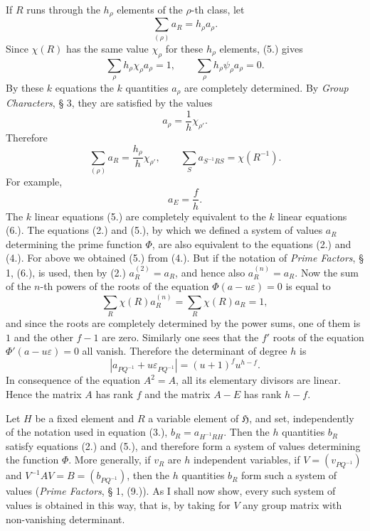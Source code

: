 \documentclass[11pt]{article}
\newcommand{\Hgr}{\mathfrak{H}}
\newcommand{\eps}{\varepsilon}
\begin{document}
If $R$ runs through the $h_\rho$ elements of the $\rho$-th class, let
\[
\sum_{(\rho)} a_R=h_\rho a_\rho.
\]
Since $\chi(R)$ has the same value $\chi_\rho$ for these $h_\rho$ elements, (5.) gives
\[
\sum_\rho h_\rho\chi_\rho a_\rho=1,
\qquad
\sum_\rho h_\rho\psi_\rho a_\rho=0.
\]
By these $k$ equations the $k$ quantities $a_\rho$ are completely determined. By \emph{Group Characters}, § 3, they are satisfied by the values
\[
a_\rho=\frac1h\chi_{\rho'}.
\]
Therefore
\begin{equation}\tag{6.}
\sum_{(\rho)}a_R=\frac{h_\rho}{h}\chi_{\rho'},
\qquad
\sum_S a_{S^{-1}RS}=\chi(R^{-1}).
\end{equation}
For example,
\begin{equation}\tag{7.}
a_E=\frac{f}{h}.
\end{equation}
The $k$ linear equations (5.) are completely equivalent to the $k$ linear equations (6.). The equations (2.) and (5.), by which we defined a system of values $a_R$ determining the prime function $\Phi$, are also equivalent to the equations (2.) and (4.). For above we obtained (5.) from (4.). But if the notation of \emph{Prime Factors}, § 1, (6.), is used, then by (2.) $a_R^{(2)}=a_R$, and hence also $a_R^{(n)}=a_R$. Now the sum of the $n$-th powers of the roots of the equation $\Phi(a-u\eps)=0$ is equal to
\[
\sum_R\chi(R)a_R^{(n)}=\sum_R\chi(R)a_R=1,
\]
and since the roots are completely determined by the power sums, one of them is $1$ and the other $f-1$ are zero. Similarly one sees that the $f'$ roots of the equation $\Phi'(a-u\eps)=0$ all vanish. Therefore the determinant of degree $h$ is
\[
|a_{PQ^{-1}}+u\eps_{PQ^{-1}}|=(u+1)^f u^{h-f}.
\]
In consequence of the equation $A^2=A$, all its elementary divisors are linear. Hence the matrix $A$ has rank $f$ and the matrix $A-E$ has rank $h-f$.

Let $H$ be a fixed element and $R$ a variable element of $\Hgr$, and set, independently of the notation used in equation (3.), $b_R=a_{H^{-1}RH}$. Then the $h$ quantities $b_R$ satisfy equations (2.) and (5.), and therefore form a system of values determining the function $\Phi$. More generally, if $v_R$ are $h$ independent variables, if $V=(v_{PQ^{-1}})$ and $V^{-1}AV=B=(b_{PQ^{-1}})$, then the $h$ quantities $b_R$ form such a system of values (\emph{Prime Factors}, § 1, (9.)). As I shall now show, every such system of values is obtained in this way, that is, by taking for $V$ any group matrix with non-vanishing determinant.
\end{document}
